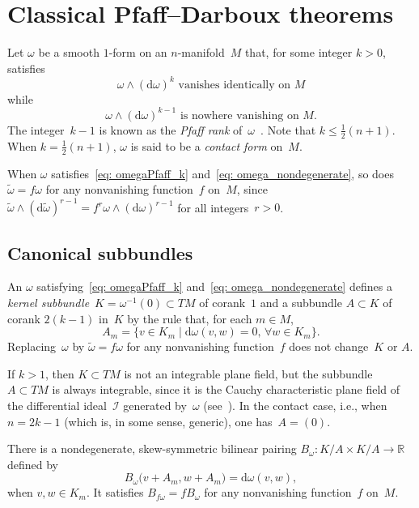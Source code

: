 \documentclass[11pt]{article}
\numberwithin{equation}{section}
\renewcommand{\d}{\mathrm{d}}%
\newcommand{\cI}{{\mathcal I}}
\newcommand{\bbR}{{\mathbb R}}
\newcommand{\w}{\wedge}
\numberwithin{equation}{section}
\begin{document}
\section{Classical Pfaff--Darboux theorems}
Let $\omega$ be a smooth $1$-form on an $n$-manifold~$M$
that, for some integer $k>0$, satisfies
\begin{equation}\label{eq: omegaPfaff_k}
\text{$\omega\w(\d\omega)^k$ vanishes identically on $M$}
\end{equation}
while
\begin{equation}\label{eq: omega_nondegenerate}
\text{$\omega\w(\d\omega)^{k-1}$ is nowhere vanishing on $M$.}
\end{equation}
The integer~$k{-}1$ is known as the \emph{Pfaff rank}
of~$\omega$~\cite[Chapter II, Section~3]{MR1083148}.
Note that $k\le \tfrac12(n{+}1)$. When $k=\tfrac12(n{+}1)$,
$\omega$ is said to be a \emph{contact form} on~$M$.

When $\omega$ satisfies~\eqref{eq: omegaPfaff_k}
and~\eqref{eq: omega_nondegenerate}, so does $\tilde\omega=f\omega$
for any nonvanishing function~$f$ on~$M$,
since $\tilde\omega\w(\d\tilde\omega)^{r-1} = f^r \omega\w(\d\omega)^{r-1}$
for all integers~$r>0$.

\subsection{Canonical subbundles}
An $\omega$ satisfying~\eqref{eq: omegaPfaff_k}
and~\eqref{eq: omega_nondegenerate} defines a \emph{kernel subbundle}~$K
= \omega^{-1}(0)\subset TM$ of corank~$1$
and a subbundle $A\subset K$ of corank $2(k{-}1)$ in~$K$
by the rule that, for each $m\in M$,
\begin{equation*}
A_m = \{ v\in K_m\mid \mathrm{d}\omega(v,w) = 0,\, \forall w\in K_m \}.
\end{equation*}
Replacing~$\omega$ by $\tilde\omega= f \omega$ for any nonvanishing
function~$f$ does not change~$K$ or $A$.

If $k>1$, then $K\subset TM$ is not an integrable plane field,
but the subbundle $A\subset TM$ is always integrable,
since it is the Cauchy characteristic plane field
of the differential ideal~$\cI$ generated by~$\omega$
(see~\cite[Chapter II, Proposition~2.1]{MR1083148}).
In the contact case, i.e., when $n=2k{-}1$ (which is,
in some sense, generic), one has~$A=(0)$.

There is a nondegenerate, skew-symmetric bilinear pairing
$B_\omega \colon K{/}A\times K{/}A\to\bbR$
defined by
\[
B_\omega\bigl(v{+}A_m,w{+}A_m\bigr) = \mathrm{d}\omega(v,w),
\]
when $v,w\in K_m$. It satisfies $B_{f\omega} = fB_\omega$
for any nonvanishing function~$f$ on~$M$.
\end{document}
